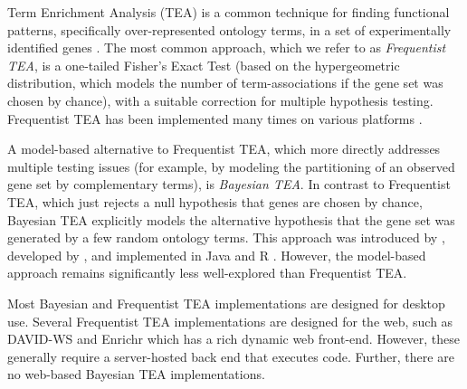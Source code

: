 
Term Enrichment Analysis (TEA) is a common technique for finding functional patterns,
specifically over-represented ontology terms, in a set of experimentally identified genes \citep{pmid15297299}.
The most common approach,
which we refer to as {\em Frequentist TEA},
is a one-tailed Fisher's Exact Test (based on the hypergeometric distribution,
which models the number of term-associations if the gene set was chosen by chance),
with a suitable correction for multiple hypothesis testing.
Frequentist TEA has been implemented many times on various platforms \citep{pmid12431279,pmid11829497,pmid12702209,pmid15297299,pmid18511468,pmid22543366,pmid23868073,pmid23586463}.

A model-based alternative to Frequentist TEA, which more directly addresses multiple testing issues
(for example, by modeling the partitioning of an observed gene set by complementary terms),
is {\em Bayesian TEA}.
In contrast to Frequentist TEA, which just rejects a null hypothesis that genes are chosen by chance,
Bayesian TEA explicitly models the alternative hypothesis that the gene set was generated by a few random ontology terms.
This approach was introduced by \cite{pmid18676451}, developed by \cite{pmid20172960},
and implemented in Java and R \citep{pmid21561920}.
However, the model-based approach remains significantly less well-explored than Frequentist TEA.





Most Bayesian and Frequentist TEA implementations are designed for desktop use.
Several Frequentist TEA implementations are designed for the web, such as
DAVID-WS \citep{pmid22543366} and
Enrichr \citep{pmid23586463} %
which has a rich dynamic web front-end.
However, these generally require a server-hosted back end that executes code.
Further, there are no web-based Bayesian TEA implementations.
